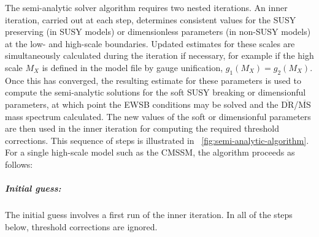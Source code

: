 \documentclass[final,3p,11pt,pdflatex]{elsarticle}
\newcommand{\ol}[1]{\overline{#1}}
\newcommand{\MSbar}{\ensuremath{\ol{\text{MS}}}\xspace}
\newcommand{\DRbar}{\ensuremath{\ol{\text{DR}}}\xspace}
\newcommand{\figref}[1]{\figurename~\ref{#1}}
\begin{document}
The semi-analytic solver algorithm requires two nested iterations.  An
inner iteration, carried out at each step, determines consistent values for
the SUSY preserving (in SUSY models) or dimensionless parameters (in non-SUSY
models) at the low- and high-scale boundaries.  Updated estimates for these
scales are simultaneously calculated during the iteration if necessary, for
example if the high scale $M_X$ is defined in the model file by gauge
unification, $g_1(M_X) = g_2(M_X)$.  Once this has converged, the resulting
estimate for these parameters is used to compute the semi-analytic solutions
for the soft SUSY breaking or dimensionful parameters, at which point the
EWSB conditions may be solved and the \DRbar/\MSbar mass spectrum
calculated.  The new values of the soft or dimensionful parameters are then used
in the inner iteration for computing the required threshold corrections.
This sequence of steps is illustrated in \figref{fig:semi-analytic-algorithm}.
For a single high-scale model such as the CMSSM, the algorithm proceeds as
follows:
%
\subparagraph{Initial guess:} The initial guess involves a first run of the
inner iteration.  In all of the steps below, threshold corrections are ignored.
%
\end{document}
